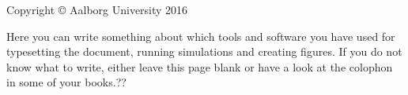 \thispagestyle{empty}
{\small
\strut\vfill %
\noindent Copyright \copyright{} Aalborg University 2016\par
\vspace{0.2cm}
\noindent Here you can write something about which tools and software you have used for typesetting the document, running simulations and creating figures. If you do not know what to write, either leave this page blank or have a look at the colophon in some of your books.??
}
\clearpage

